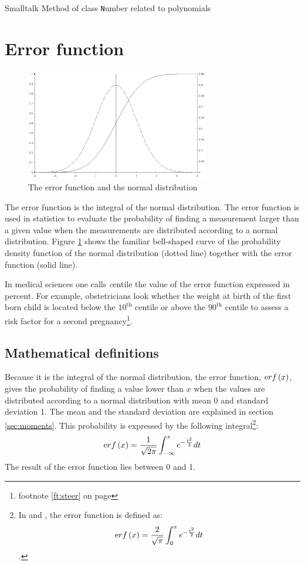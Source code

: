 \begin{listing}[label=lst:polynomialNumber]{Smalltalk}
{Method of class {\texttt Number} related to polynomials}

\end{listing}

\section{Error function}
\label{sec:errorFunction}
\begin{figure}
\centering\includegraphics[width=8cm]{Figures/ErrorFunction}
\caption{The error function and the normal distribution}
\label{fig:errorFunction}
\end{figure}
The error function is the integral of the normal distribution. The
error function is used in statistics to evaluate the probability
of finding a measurement larger than a given value when the
measurements are distributed according to a normal distribution.
Figure \ref{sec:errorFunction} shows the familiar bell-shaped
curve of the probability density function of the normal
distribution (dotted line) together with the error function (solid
line).

In medical sciences one calls {\textsl centile} the value of the error
function expressed in percent. For example, obstetricians look
whether the weight at birth of the first born child is located
below the $10^{\mbox{th}}$ centile or above the $90^{\mbox{th}}$
centile to assess a risk factor for a second
pregnancy\footnote{\cf footnote \ref{ft:steer} on page
\pageref{ft:steer}}.

\subsection{Mathematical definitions}
\label{sec:errorFunctionDef} Because it is the integral of the
normal distribution, the error function, $\mathop{\textrm erf}\left(x\right)$,
gives the probability of finding a value lower than $x$ when the
values are distributed according to a normal distribution with
mean 0 and standard deviation 1. The mean and the standard
deviation are explained in section \ref{sec:moments}. This
probability is expressed by the following integral\footnote{In
\cite{AbrSteg} and \cite{Press}, the error function is defined as:
$$\mathop{\textrm erf}\left(x\right)={2 \over \sqrt{\pi}}\int_0^x e^{-{t^2 \over 2
}}dt$$.}:
\begin{equation}
\mathop{\textrm erf}\left(x\right)={1 \over \sqrt{2\pi}}\int_{-\infty}^x e^{-{t^2
\over 2 }}dt
\end{equation}
The result of the error function lies between 0 and 1.

